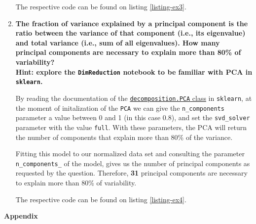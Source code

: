 \documentclass[12pt]{article}
\begin{document}
\begin{enumerate}[leftmargin=\labelsep]
          The respective code can be found on listing \ref{listing-ex3}.

    \item {\color{questioncolor}\bfseries
          The fraction of variance explained by a principal component is the ratio
          between the variance of that component (i.e., its eigenvalue) and total
          variance (i.e., sum of all eigenvalues).
          How many principal components are necessary to explain more than 80\%
          of variability?\\
          Hint: explore the \texttt{DimReduction} notebook to be familiar
          with PCA in \texttt{sklearn}.
          }\\
          \vspace{0.5em}

          By reading the documentation of the
          \href{https://scikit-learn.org/stable/modules/generated/sklearn.decomposition.PCA.html}{\texttt{decomposition.PCA} class}
          in \texttt{sklearn}, at the moment of initalization of the \texttt{PCA} we can give
          the \texttt{n\_components} parameter a value between 0 and 1 (in this case 0.8),
          and set the \texttt{svd\_solver} parameter with the value \texttt{full}.
          With these parameters, the PCA will return the number of components that explain more than 80\% of the variance.


          Fitting this model to our normalized data set and consulting the parameter
          \texttt{n\_components\_} of the model, gives us the number of principal components
          as requested by the question.
          Therefore, \textbf{31} principal components are necessary to explain more than 80\% of variability.

          The respective code can be found on listing \ref{listing-ex4}.

\end{enumerate}

\pagebreak

\center\large{\textbf{Appendix}\vskip 0.3cm}



\vspace*{1.5cm}



\vspace*{1.5cm}


\end{document}

